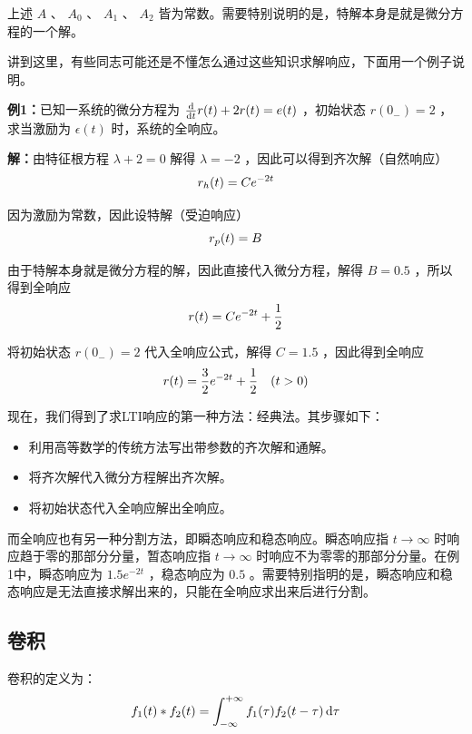 \documentclass[UTF8,a4paper,11pt]{article}
\begin{document}
上述 $A$ 、 $A_0$ 、 $A_1$ 、 $A_2$ 皆为常数。需要特别说明的是，特解本身是就是微分方程的一个解。

讲到这里，有些同志可能还是不懂怎么通过这些知识求解响应，下面用一个例子说明。

\textbf{例1：}已知一系统的微分方程为 $\frac{{\rm d}}{{\rm d}t}r(t)+2r(t)=e(t)$ ，初始状态 $r(0_{-})=2$ ，求当激励为 $\epsilon(t)$ 时，系统的全响应。

\textbf{解：}由特征根方程 $\lambda +2=0$ 解得 $\lambda =-2$ ，因此可以得到齐次解（自然响应）
\begin{equation}
r_h(t)=Ce^{-2t}
\notag
\end{equation}

因为激励为常数，因此设特解（受迫响应）
\begin{equation}
r_p(t)=B
\notag
\end{equation}

由于特解本身就是微分方程的解，因此直接代入微分方程，解得 $B=0.5$ ，所以得到全响应
\begin{equation}
r(t)=Ce^{-2t}+\frac{1}{2}
\notag
\end{equation}

将初始状态 $r(0_{-})=2$ 代入全响应公式，解得 $C=1.5$ ，因此得到全响应
\begin{equation}
r(t)=\frac{3}{2}e^{-2t}+\frac{1}{2}\quad(t>0)
\notag
\end{equation}

现在，我们得到了求LTI响应的第一种方法：经典法。其步骤如下：
\begin{itemize}
\item 利用高等数学的传统方法写出带参数的齐次解和通解。
\item 将齐次解代入微分方程解出齐次解。
\item 将初始状态代入全响应解出全响应。
\end{itemize} 

而全响应也有另一种分割方法，即瞬态响应和稳态响应。瞬态响应指 $t\to \infty$ 时响应趋于零的那部分分量，暂态响应指 $t\to \infty$ 时响应不为零零的那部分分量。在例1中，瞬态响应为 $1.5e^{-2t}$ ，稳态响应为 $0.5$ 。需要特别指明的是，瞬态响应和稳态响应是无法直接求解出来的，只能在全响应求出来后进行分割。

\subsection{卷积}
卷积的定义为：
\begin{equation}
f_1(t)*f_2(t)=\int_{-\infty}^{+\infty} {f_1(\tau)f_2(t-\tau)} \,{\rm d}\tau
\end{equation}
\end{document}
